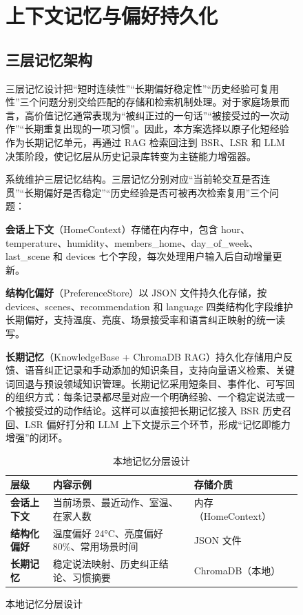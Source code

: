 \documentclass[12pt,a4paper,oneside]{ctexrep}
\begin{document}
\begin{figure}[H]
\chapter{上下文记忆与偏好持久化}

\section{三层记忆架构}

三层记忆设计把“短时连续性”“长期偏好稳定性”“历史经验可复用性”三个问题分别交给匹配的存储和检索机制处理。对于家庭场景而言，高价值记忆通常表现为“被纠正过的一句话”“被接受过的一次动作”“长期重复出现的一项习惯”。因此，本方案选择以原子化短经验作为长期记忆单元，再通过 RAG 检索回注到 BSR、LSR 和 LLM 决策阶段，使记忆层从历史记录库转变为主链能力增强器。

系统维护三层记忆结构。三层记忆分别对应“当前轮交互是否连贯”“长期偏好是否稳定”“历史经验是否可被再次检索复用”三个问题：

\textbf{会话上下文}（HomeContext）存储在内存中，包含 hour、temperature、humidity、members\_home、day\_of\_week、last\_scene 和 devices 七个字段，每次处理用户输入后自动增量更新。

\textbf{结构化偏好}（PreferenceStore）以 JSON 文件持久化存储，按 devices、scenes、recommendation 和 language 四类结构化字段维护长期偏好，支持温度、亮度、场景接受率和语言纠正映射的统一读写。

\textbf{长期记忆}（KnowledgeBase + ChromaDB RAG）持久化存储用户反馈、语音纠正记录和手动添加的知识条目，支持向量语义检索、关键词回退与预设领域知识管理。长期记忆采用短条目、事件化、可写回的组织方式：每条记录都尽量对应一个明确经验、一个稳定说法或一个被接受过的动作结论。这样可以直接把长期记忆接入 BSR 历史召回、LSR 偏好打分和 LLM 上下文提示三个环节，形成“记忆即能力增强”的闭环。

\begin{table}[H]
    \centering
    \caption{本地记忆分层设计}
    \begin{tabularx}{\textwidth}{>{\bfseries}p{2.5cm}X>{\centering\arraybackslash}p{2.5cm}X}
        \toprule
        层级 & 内容示例 & 存储介质 \\
        \midrule
        会话上下文 & 当前场景、最近动作、室温、在家人数 & 内存（HomeContext） \\
        结构化偏好 & 温度偏好 24°C、亮度偏好 80\%、常用场景时间 & JSON 文件 \\
        长期记忆 & 稳定说法映射、历史纠正结论、习惯摘要 & ChromaDB（本地） \\
        \bottomrule
    \end{tabularx}
\end{table}


\end{figure}
\end{document}
